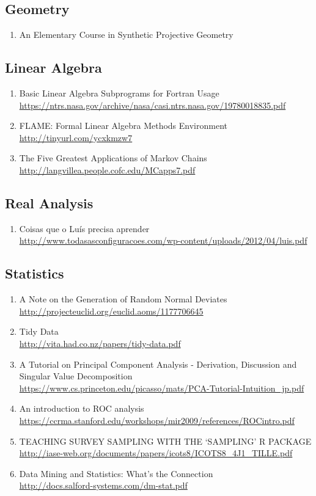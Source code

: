 \documentclass{article}
\begin{document}
\subsection{Geometry}
\begin{enumerate}
	\item {An Elementary Course in Synthetic Projective Geometry}
\end{enumerate}
\subsection{Linear Algebra}
\begin{enumerate}
	\item {Basic Linear Algebra Subprograms for Fortran Usage\\
\url{https://ntrs.nasa.gov/archive/nasa/casi.ntrs.nasa.gov/19780018835.pdf}}
	\item{FLAME: Formal Linear Algebra Methods Environment\\
\url{http://tinyurl.com/ycxkmzw7}}
	\item{The Five Greatest Applications of Markov Chains\\
\url{http://langvillea.people.cofc.edu/MCapps7.pdf}}
\end{enumerate}
\subsection{Real Analysis}
\begin{enumerate}
	\item {Coisas que o Luís precisa aprender\\
\url{http://www.todasasconfiguracoes.com/wp-content/uploads/2012/04/luis.pdf}}
\end{enumerate}
\subsection {Statistics}
\begin{enumerate}
	\item {A Note on the Generation of Random Normal Deviates\\
\url{http://projecteuclid.org/euclid.aoms/1177706645}}
	\item {Tidy Data\\
\url{http://vita.had.co.nz/papers/tidy-data.pdf}}
	\item {A Tutorial on Principal Component Analysis - Derivation, Discussion and Singular Value Decomposition\\
\url{https://www.cs.princeton.edu/picasso/mats/PCA-Tutorial-Intuition_jp.pdf}}
	\item{An introduction to ROC analysis\\
\url{https://ccrma.stanford.edu/workshops/mir2009/references/ROCintro.pdf}}
	\item{TEACHING SURVEY SAMPLING WITH THE ‘SAMPLING’ R PACKAGE
	\url{http://iase-web.org/documents/papers/icots8/ICOTS8_4J1_TILLE.pdf}}
	\item{Data Mining and Statistics: What's the Connection\\ \url{http://docs.salford-systems.com/dm-stat.pdf}}
\end{enumerate}
\end{document}
